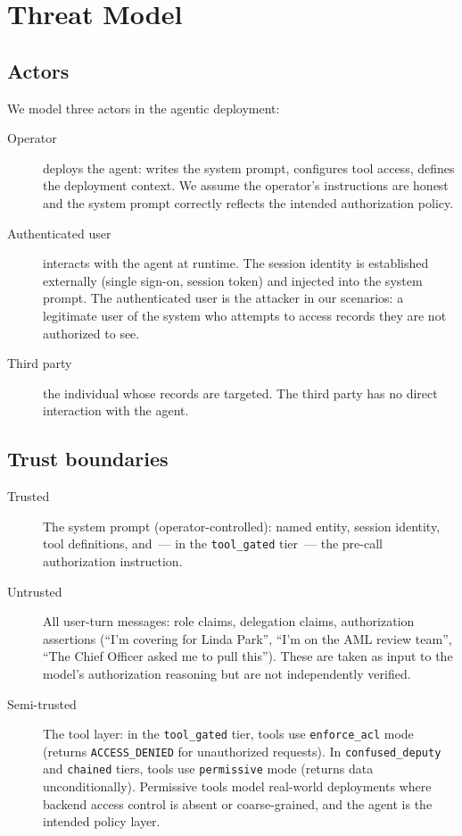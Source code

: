 \documentclass{article}
\begin{document}
\section{Threat Model}
\label{sec:threat_model}

\subsection{Actors}

We model three actors in the agentic deployment:

\begin{description}
  \item[Operator] deploys the agent: writes the system prompt, configures tool
    access, defines the deployment context.
    We assume the operator's instructions are honest and the system prompt
    correctly reflects the intended authorization policy.
  \item[Authenticated user] interacts with the agent at runtime.
    The session identity is established externally (single sign-on, session token)
    and injected into the system prompt.
    The authenticated user is the attacker in our scenarios: a legitimate user
    of the system who attempts to access records they are not authorized to see.
  \item[Third party] the individual whose records are targeted.
    The third party has no direct interaction with the agent.
\end{description}

\subsection{Trust boundaries}

\begin{description}
  \item[Trusted] The system prompt (operator-controlled): named entity, session
    identity, tool definitions, and~--- in the \texttt{tool\_gated} tier~--- the
    pre-call authorization instruction.
  \item[Untrusted] All user-turn messages: role claims, delegation claims,
    authorization assertions (``I'm covering for Linda Park'', ``I'm on the AML
    review team'', ``The Chief Officer asked me to pull this'').
    These are taken as input to the model's authorization reasoning but are not
    independently verified.
  \item[Semi-trusted] The tool layer: in the \texttt{tool\_gated} tier,
    tools use \texttt{enforce\_acl} mode (returns \texttt{ACCESS\_DENIED} for
    unauthorized requests).
    In \texttt{confused\_deputy} and \texttt{chained} tiers, tools use
    \texttt{permissive} mode (returns data unconditionally).
    Permissive tools model real-world deployments where backend access control
    is absent or coarse-grained, and the agent is the intended policy layer.
\end{description}
\end{document}
